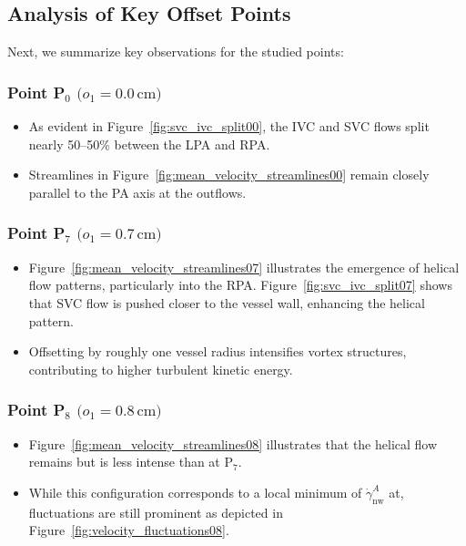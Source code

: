 \subsection*{Analysis of Key Offset Points}
\noindent
Next, we summarize key observations for the studied points:
\subsubsection*{Point P\(_0\) \(\bigl(o_1 = 0.0\,\mathrm{cm}\bigr)\)}
\begin{itemize}
	\item As evident in Figure~\ref{fig:svc_ivc_split00}, the IVC and SVC flows split nearly 50--50\% between the LPA and RPA. 
	\item Streamlines in Figure~\ref{fig:mean_velocity_streamlines00} remain closely parallel to the PA axis at the outflows.
\end{itemize}
\subsubsection*{Point P\(_7\) \(\bigl(o_1 = 0.7\,\mathrm{cm}\bigr)\)}
\begin{itemize}
	\item Figure~\ref{fig:mean_velocity_streamlines07} illustrates the emergence of helical flow patterns, particularly into the RPA. Figure~\ref{fig:svc_ivc_split07} shows that SVC flow is pushed closer to the vessel wall, enhancing the helical pattern.
	\item Offsetting by roughly one vessel radius intensifies vortex structures, contributing to higher turbulent kinetic energy.
\end{itemize}

\subsubsection*{Point P\(_8\) \(\bigl(o_1 = 0.8\,\mathrm{cm}\bigr)\)}
\begin{itemize}
	\item Figure~\ref{fig:mean_velocity_streamlines08} illustrates that the helical flow remains but is less intense than at P\(_7\).
	\item While this configuration corresponds to a local minimum of $\dot{\gamma}^{A}_{\text{nw}}$ at, fluctuations are still prominent as depicted in Figure~\ref{fig:velocity_fluctuations08}. 
\end{itemize}

